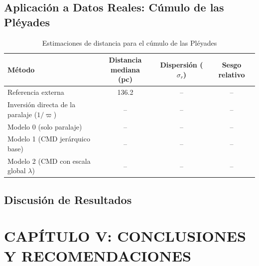 \documentclass[stu, 12pt, letterpaper, donotrepeattitle, floatsintext, natbib]{apa7_ula}
\begin{document}
\subsection{Aplicación a Datos Reales: Cúmulo de las Pléyades}

\begin{table}[H]
\centering
\small
\caption{Estimaciones de distancia para el cúmulo de las Pléyades}\label{tab:resultados_pleyades}
\begin{tabular}{@{}lccc@{}}
\hline
Método & \shortstack{Distancia mediana\\(pc)} & \shortstack{Dispersión\\($\sigma_r$)} & Sesgo relativo \\
\hline
Referencia externa & 136.2 & -- & -- \\
Inversión directa de la paralaje ($1/\varpi$) & -- & -- & -- \\
Modelo 0 (solo paralaje) & -- & -- & -- \\
Modelo 1 (CMD jerárquico base) & -- & -- & -- \\
Modelo 2 (CMD con escala global $\lambda$) & -- & -- & -- \\
\hline
\end{tabular}
\end{table}

\subsection{Discusión de Resultados}

\section{CAPÍTULO V: CONCLUSIONES Y RECOMENDACIONES}
\end{document}

